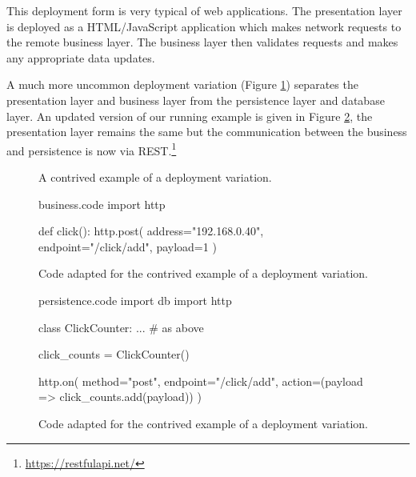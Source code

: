 This deployment form is very typical of web applications.
The presentation layer is deployed as a HTML/JavaScript application which makes network requests to the remote business layer.
The business layer then validates requests and makes any appropriate data updates.

A much more uncommon deployment variation (Figure \ref{fig:uncommon-diagram}) separates
the presentation layer and business layer from the persistence layer and database layer.
An updated version of our running example is given in Figure \ref{fig:uncommon-code},
the presentation layer remains the same but the communication between the business and persistence is now via REST.\footnote{\url{https://restfulapi.net/}}

\begin{figure}[ht]
    \centering
    \caption{A contrived example of a deployment variation.}
    \label{fig:uncommon-diagram}
\end{figure}

\begin{figure}[H]
\begin{code}[style=python]{business.code}
import http

def click():
    http.post(
        address="192.168.0.40",
        endpoint="/click/add",
        payload=1
    )
\end{code}
\caption{Code adapted for the contrived example of a deployment variation.}
\label{fig:uncommon-code}
\end{figure}

\begin{figure}[H]
\ContinuedFloat
\begin{code}[style=python]{persistence.code}
import db
import http

class ClickCounter:
    ... # as above

click_counts = ClickCounter()

http.on(
    method="post",
    endpoint="/click/add",
    action=(payload => click_counts.add(payload))
)
\end{code}
\caption{Code adapted for the contrived example of a deployment variation.}
\end{figure}

